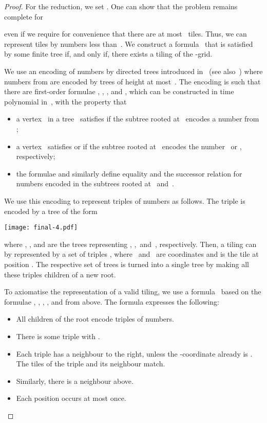 \documentclass{LMCS}
\begin{document}
\begin{thm}
\begin{proof}
For the reduction, we set .
One can show that the problem remains complete for

even if we require for convenience that there are at most~ tiles.
Thus, we can represent tiles by numbers less than~.
We construct a formula~ that is satisfied by some finite tree
if, and only if, there exists a tiling of the -grid.

We use an encoding of numbers by directed trees
introduced in~\cite{FlumGrohe06} (see also~\cite{DawarGrKrSchw07})
where numbers from  are encoded by trees of height at most~.
The encoding is such that there are first-order formulae
, , ,
 and ,
which can be constructed in time polynomial in~,
with the property that
\begin{itemize}
\item a vertex~ in a tree~ satisfies  if the
  subtree rooted at~ encodes a number from \?;
\item a vertex~ satisfies  or 
  if the subtree rooted at~ encodes the number ~or , respectively\?;
\item the formulae  and 
  similarly define equality and the successor relation for numbers
  encoded in the subtrees rooted at~ and~.
\end{itemize}

\noindent We use this encoding to represent triples of numbers as follows.
The triple  is encoded by a tree of the form
\begin{center}
\texttt{[image: final-4.pdf]}
\end{center}
where , , and  are the trees representing
, ,~and~, respectively.
Then, a tiling can by represented by a set of triples ,
where ~and~ are coordinates and  is the tile at position .
The respective set of trees is turned into a single tree
by making all these triples children of a new root.

To axiomatise the representation of a valid tiling,
we use a formula~ based on the formulae
, , ,
, and  from above.
The formula  expresses the following\?:
\begin{itemize}
\item All children of the root encode triples of numbers.
\item There is some triple  with .
\item Each triple has a neighbour to the right,
  unless the -coordinate already is .
  The tiles of the triple and its neighbour match.
\item Similarly, there is a neighbour above.
\item Each position occurs at most once.
\end{itemize}


\end{proof}
\end{thm}
\end{document}
